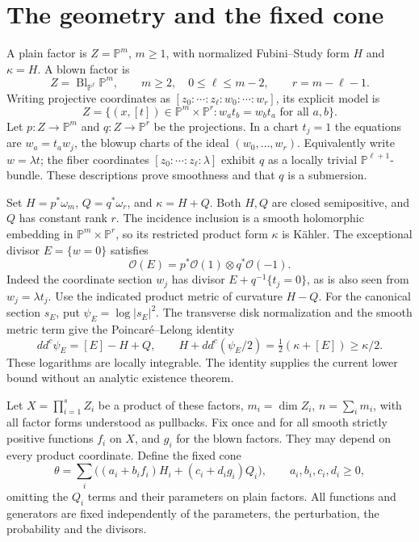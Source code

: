 \documentclass[11pt]{article}
\newcommand{\ddc}{dd^c}
\newcommand{\PP}{\mathbb P}
\begin{document}
\section{The geometry and the fixed cone}
A plain factor is $Z=\PP^m$, $m\geq1$, with normalized
Fubini--Study form $H$ and $\kappa=H$. A blown factor is
\[
 Z=\operatorname{Bl}_{\PP^\ell}\PP^m,
 \qquad m\geq2,\quad0\leq\ell\leq m-2,
 \qquad r=m-\ell-1.
\]
Writing projective coordinates as $[z_0:\cdots:z_\ell:w_0:\cdots:w_r]$,
its explicit model is
\[
 Z=\{(x,[t])\in\PP^m\times\PP^r:
                        w_at_b=w_bt_a\text{ for all }a,b\}.
\]
Let $p:Z\to\PP^m$ and $q:Z\to\PP^r$ be the projections. In a
chart $t_j=1$ the equations are $w_a=t_aw_j$, the blowup charts
of the ideal $(w_0,\ldots,w_r)$. Equivalently write $w=\lambda t$;
the fiber coordinates $[z_0:\cdots:z_\ell:\lambda]$ exhibit $q$
as a locally trivial $\PP^{\ell+1}$-bundle. These descriptions
prove smoothness and that $q$ is a submersion.

Set $H=p^*\omega_m$, $Q=q^*\omega_r$, and $\kappa=H+Q$.
Both $H,Q$ are closed semipositive, and $Q$ has constant rank $r$.
The incidence inclusion is a smooth holomorphic embedding in
$\PP^m\times\PP^r$, so its restricted product form $\kappa$
is K\"ahler. The exceptional divisor $E=\{w=0\}$ satisfies
\[
 \mathcal O(E)=p^*\mathcal O(1)\otimes q^*\mathcal O(-1).
\]
Indeed the coordinate section $w_j$ has divisor
$E+q^{-1}\{t_j=0\}$, as is also seen from $w_j=\lambda t_j$.
Use the indicated product metric of curvature $H-Q$. For the
canonical section $s_E$, put $\psi_E=\log|s_E|^2$. The transverse
disk normalization and the smooth metric term give the
Poincar\'e--Lelong identity \cite[III.2.15 and V.13.2]{Demailly}
\begin{equation}\label{eq:exceptional}
 \ddc\psi_E=[E]-H+Q,
 \qquad H+\ddc(\psi_E/2)=\tfrac12(\kappa+[E])\geq\kappa/2.
\end{equation}
These logarithms are locally integrable. The identity supplies the
current lower bound without an analytic existence theorem.

Let $X=\prod_{i=1}^s Z_i$ be a product of these factors,
$m_i=\dim Z_i$, $n=\sum_i m_i$, with all factor forms understood
as pullbacks. Fix once and for all smooth strictly positive functions
$f_i$ on $X$, and $g_i$ for the blown factors. They may depend on
every product coordinate. Define the fixed cone
\begin{equation}\label{eq:cone}
 \theta=\sum_i\bigl((a_i+b_if_i)H_i+(c_i+d_ig_i)Q_i\bigr),
 \qquad a_i,b_i,c_i,d_i\geq0,
\end{equation}
omitting the $Q_i$ terms and their parameters on plain factors.
All functions and generators are fixed independently of the parameters,
the perturbation, the probability and the divisors.
\end{document}
